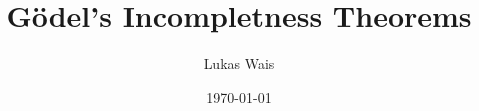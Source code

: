 \documentclass[aspectratio=169]{beamer}
\title{Gödel's Incompletness Theorems}
\author{Lukas Wais}
\institute{Course 326.901}
\date{\today}
\begin{document}
\frame{\titlepage}
\end{document}
